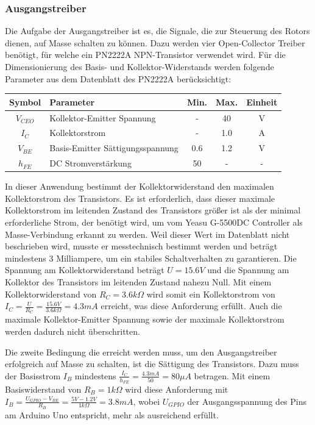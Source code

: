 \subsubsection{Ausgangstreiber}
Die Aufgabe der Ausgangstreiber ist es, die Signale, die zur Steuerung des Rotors dienen, auf Masse schalten zu können. Dazu werden vier Open-Collector Treiber benötigt, für welche ein PN2222A NPN-Transistor verwendet wird. Für die Dimensionierung des Basis- und Kollektor-Widerstands werden folgende Parameter aus dem Datenblatt des PN2222A \cite{noauthor_pn2222a_nodate} berücksichtigt: 
\begin{table}[H]
	\centering
	\begin{tabular}{| c | l | c | c | c |}
		\hline
		\textbf{Symbol} & \textbf{Parameter} & \textbf{Min.} & \textbf{Max.} & \textbf{Einheit} \\
		\hline
		${V}_{CEO}$ & Kollektor-Emitter Spannung & - & 40 & V \\
		\hline
		${I}_{C}$ & Kollektorstrom & - & 1.0 & A \\
		\hline
		${V}_{BE}$ & Basis-Emitter Sättigungsspannung & 0.6 & 1.2 & V \\
		\hline
		${h}_{FE}$ & DC Stromverstärkung & 50 & - & - \\
		\hline
	\end{tabular}
\end{table}

In dieser Anwendung bestimmt der Kollektorwiderstand den maximalen Kollektorstrom des Transistors. Es ist erforderlich, dass dieser maximale Kollektorstrom im leitenden Zustand des Transistors größer ist als der minimal erforderliche Strom, der benötigt wird, um vom Yeasu G-5500DC Controller als Masse-Verbindung erkannt zu werden. Weil dieser Wert im Datenblatt \cite{noauthor_yaesu_nodate} nicht beschrieben wird, musste er messtechnisch bestimmt werden und beträgt mindestens 3 Milliampere, um ein stabiles Schaltverhalten zu garantieren. Die Spannung am Kollektorwiderstand beträgt $U=15.6V$ und die Spannung am Kollektor des Transistors im leitenden Zustand nahezu Null. Mit einem Kollektorwiderstand von $R_C=3.6k\Omega$ wird somit ein Kollektorstrom von $I_C=\frac{U}{R_C}=\frac{15.6V}{3.6k\Omega}=4.3mA$ erreicht, was diese Anforderung erfüllt. Auch die maximale Kollektor-Emitter Spannung sowie der maximale Kollektorstrom werden dadurch nicht überschritten. 

Die zweite Bedingung die erreicht werden muss, um den Ausgangstreiber erfolgreich auf Masse zu schalten, ist die Sättigung des Transistors. Dazu muss der Basisstrom $I_B$ mindestens $\frac{I_C}{h_{FE}}=\frac{4.3mA}{50}=80\mu A$ betragen. Mit einem Basiswiderstand von $R_B=1k\Omega$ wird diese Anforderung mit $I_B=\frac{U_{GPIO}-V_{BE}}{R_B}=\frac{5V-1.2V}{1k\Omega}=3.8mA$, wobei $U_{GPIO}$ der Ausgangsspannung des Pins am Arduino Uno \cite{noauthor_r3_nodate} entspricht, mehr als ausreichend erfüllt. 

